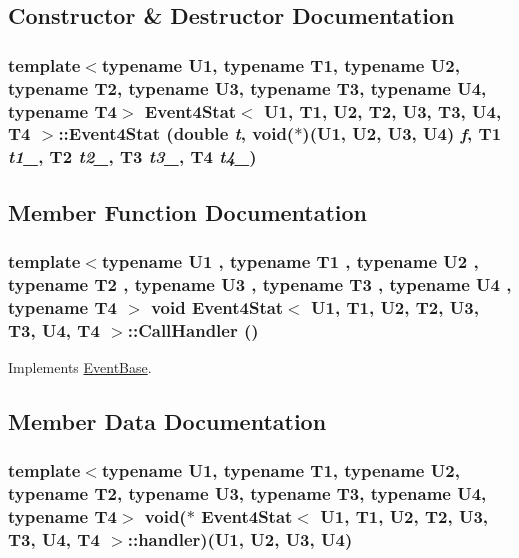 \subsection{Constructor \& Destructor Documentation}
\hypertarget{classEvent4Stat_ef35a029c53b7da66278dd753d15a6d3}{
\subsubsection[{Event4Stat}]{\setlength{\rightskip}{0pt plus 5cm}template$<$typename U1, typename T1, typename U2, typename T2, typename U3, typename T3, typename U4, typename T4$>$ {\bf Event4Stat}$<$ U1, T1, U2, T2, U3, T3, U4, T4 $>$::{\bf Event4Stat} (double {\em t}, \/  void($\ast$)(U1, U2, U3, U4) {\em f}, \/  T1 {\em t1\_}, \/  T2 {\em t2\_}, \/  T3 {\em t3\_}, \/  T4 {\em t4\_})}}
\label{classEvent4Stat_ef35a029c53b7da66278dd753d15a6d3}




\subsection{Member Function Documentation}
\hypertarget{classEvent4Stat_4dfca297cb5eede83851898b5c4f2f76}{
\subsubsection[{CallHandler}]{\setlength{\rightskip}{0pt plus 5cm}template$<$typename U1 , typename T1 , typename U2 , typename T2 , typename U3 , typename T3 , typename U4 , typename T4 $>$ void {\bf Event4Stat}$<$ U1, T1, U2, T2, U3, T3, U4, T4 $>$::CallHandler ()}}
\label{classEvent4Stat_4dfca297cb5eede83851898b5c4f2f76}




Implements \hyperlink{classEventBase_121ca64dec88c8d9589c064b0060d037}{EventBase}.

\subsection{Member Data Documentation}
\hypertarget{classEvent4Stat_77188f75f46284cde2b6baa8851e9487}{
\subsubsection[{handler}]{\setlength{\rightskip}{0pt plus 5cm}template$<$typename U1, typename T1, typename U2, typename T2, typename U3, typename T3, typename U4, typename T4$>$ void($\ast$ {\bf Event4Stat}$<$ U1, T1, U2, T2, U3, T3, U4, T4 $>$::{\bf handler})(U1, U2, U3, U4)}}
\label{classEvent4Stat_77188f75f46284cde2b6baa8851e9487}


